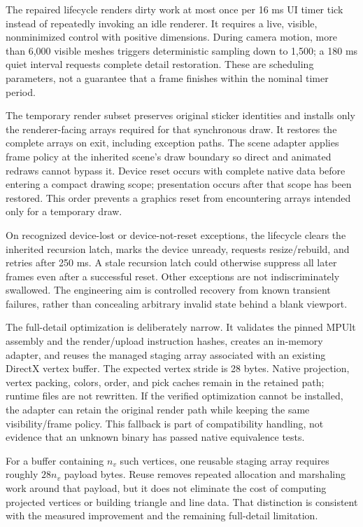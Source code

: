 \documentclass[a4paper,11pt]{article}
\begin{document}
The repaired lifecycle renders dirty work at most once per 16 ms UI timer tick instead of repeatedly invoking an idle renderer. It requires a live, visible, nonminimized control with positive dimensions. During camera motion, more than 6,000 visible meshes triggers deterministic sampling down to 1,500; a 180 ms quiet interval requests complete detail restoration. These are scheduling parameters, not a guarantee that a frame finishes within the nominal timer period.

The temporary render subset preserves original sticker identities and installs only the renderer-facing arrays required for that synchronous draw. It restores the complete arrays on exit, including exception paths. The scene adapter applies frame policy at the inherited scene's draw boundary so direct and animated redraws cannot bypass it. Device reset occurs with complete native data before entering a compact drawing scope; presentation occurs after that scope has been restored. This order prevents a graphics reset from encountering arrays intended only for a temporary draw.

On recognized device-lost or device-not-reset exceptions, the lifecycle clears the inherited recursion latch, marks the device unready, requests resize/rebuild, and retries after 250 ms. A stale recursion latch could otherwise suppress all later frames even after a successful reset. Other exceptions are not indiscriminately swallowed. The engineering aim is controlled recovery from known transient failures, rather than concealing arbitrary invalid state behind a blank viewport.

The full-detail optimization is deliberately narrow. It validates the pinned MPUlt assembly and the render/upload instruction hashes, creates an in-memory adapter, and reuses the managed staging array associated with an existing DirectX vertex buffer. The expected vertex stride is 28 bytes. Native projection, vertex packing, colors, order, and pick caches remain in the retained path; runtime files are not rewritten. If the verified optimization cannot be installed, the adapter can retain the original render path while keeping the same visibility/frame policy. This fallback is part of compatibility handling, not evidence that an unknown binary has passed native equivalence tests.

For a buffer containing \(n_v\) such vertices, one reusable staging array requires roughly \(28n_v\) payload bytes. Reuse removes repeated allocation and marshaling work around that payload, but it does not eliminate the cost of computing projected vertices or building triangle and line data. That distinction is consistent with the measured improvement and the remaining full-detail limitation.
\end{document}
